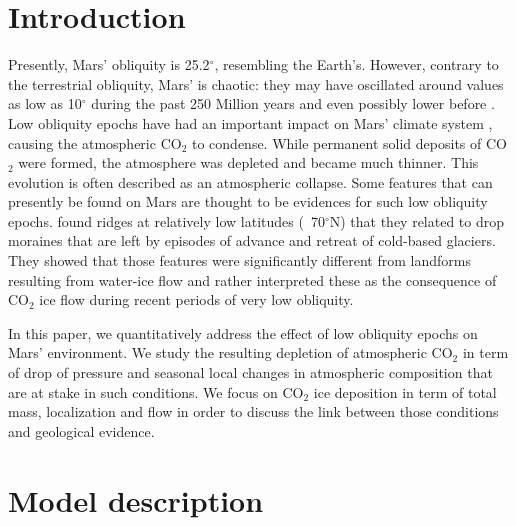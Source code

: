 \section{Introduction}
\label{sc:Intro}

Presently, Mars' obliquity is 25.2$^{\circ}$, resembling the Earth's. However,
contrary to the terrestrial obliquity, Mars' is chaotic: they may have oscillated around
values as low as 10$^{\circ}$ during the past 250 Million years and even possibly lower before \citep{Lask:04}.
Low obliquity epochs have had an important impact on Mars' climate system \cite{Forg:17} ,
causing the atmospheric CO$_2$ to condense. While permanent solid deposits of CO$_2$
were formed, the atmosphere was depleted and became much thinner. This evolution is 
often described as an atmospheric collapse. Some features that can presently be found
on Mars are thought to be evidences for such low obliquity epochs.
\citep{Kres:11} found ridges at relatively low latitudes (~70$^{\circ}$N) that they related
to drop moraines that are left by episodes of advance and retreat of cold-based glaciers.
They showed that those features were significantly different from landforms resulting from
water-ice flow and rather interpreted these as the consequence of CO$_2$ ice flow
during recent periods of very low obliquity.

In this paper, we quantitatively address the effect of low obliquity epochs on Mars'
environment. We study the resulting depletion of atmospheric CO$_2$ in term of drop of
pressure and seasonal local changes in atmospheric composition that are at stake in such
conditions. We focus on CO$_2$ ice deposition in term of total mass, localization and flow
in order to discuss the link between those conditions and geological evidence.

\section{Model description}

